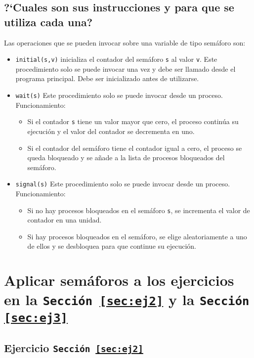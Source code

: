 \documentclass{article}
\begin{document}
\subsection{?`Cuales son sus instrucciones y para que se utiliza cada una?}
Las operaciones que se pueden invocar sobre una variable de tipo sem\'aforo son:
\begin{itemize}
\item \texttt{initial(s,v)} inicializa el contador del sem\'aforo \texttt{s} al valor \texttt{v}. Este procedimiento solo se puede invocar una vez y debe ser llamado desde el programa principal. Debe ser inicializado antes de utilizarse.
\item \texttt{wait(s)} Este procedimiento solo se puede invocar desde un proceso. Funcionamiento:
  \begin{itemize}
    \item Si el contador \texttt{s} tiene un valor mayor que cero, el proceso contin\'ua su ejecuci\'on y el valor del contador se decrementa en uno.
    \item Si el contador del sem\'aforo tiene el contador igual a cero, el proceso se queda bloqueado y se a\~{n}ade a la lista de procesos bloqueados del sem\'aforo.
  \end{itemize}
\item \texttt{signal(s)} Este procedimiento solo se puede invocar desde un proceso. Funcionamiento:
  \begin{itemize}
    \item Si no hay procesos bloqueados en el sem\'aforo \texttt{s}, se incrementa el valor de contador en una unidad.
    \item Si hay procesos bloqueados en el sem\'aforo, se elige aleatoriamente a uno de ellos y se desbloquea para que continue su ejecuci\'on.
  \end{itemize}
\end{itemize}

\section{Aplicar sem\'aforos a los ejercicios en la \texttt{Secci\'on \ref{sec:ej2}} y la \texttt{Secci\'on \ref{sec:ej3}}}

\subsection{Ejercicio \texttt{Secci\'on \ref{sec:ej2}}}


\end{document}
